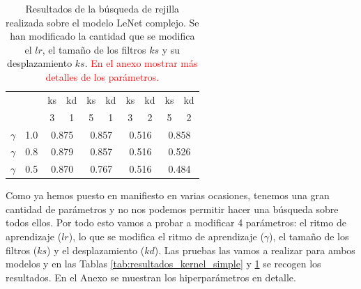 \documentclass[a4paper,12pt,twoside,titlepage]{article}
\newcommand{\red}[1]{\textcolor{red}{#1}}
\begin{document}
\begin{table}[h!]
  \centering
  \begin{tabular}{|cc||cc|cc|cc|cc|}
  \hline
  \multicolumn{2}{|c||}{\multirow{2}{*}{}} & \multicolumn{1}{c|}{ks} & kd & \multicolumn{1}{c|}{ks} & kd & \multicolumn{1}{c|}{ks} & kd & \multicolumn{1}{c|}{ks} & kd \\ \cline{3-10} 
  \multicolumn{2}{|c||}{}                  & \multicolumn{1}{c|}{3}  & 1  & \multicolumn{1}{c|}{5}  & 1  & \multicolumn{1}{c|}{3}  & 2  & \multicolumn{1}{c|}{5}  & 2  \\ \hline\hline
  \multicolumn{1}{|c|}{$\gamma$}   & 1.0  & \multicolumn{2}{c|}{0.875}   & \multicolumn{2}{c|}{0.857}   & \multicolumn{2}{c|}{0.516}   & \multicolumn{2}{c|}{0.858}   \\ \hline
  \multicolumn{1}{|c|}{$\gamma$}   & 0.8  & \multicolumn{2}{c|}{0.879}   & \multicolumn{2}{c|}{0.857}   & \multicolumn{2}{c|}{0.516}   & \multicolumn{2}{c|}{0.526}   \\ \hline
  \multicolumn{1}{|c|}{$\gamma$}   & 0.5  & \multicolumn{2}{c|}{0.870}   & \multicolumn{2}{c|}{0.767}   & \multicolumn{2}{c|}{0.516}   & \multicolumn{2}{c|}{0.484}   \\ \hline
  \end{tabular}
  \caption{Resultados de la búsqueda de rejilla realizada sobre el modelo  LeNet complejo. Se han modificado la cantidad que se modifica el $lr$, el tamaño de los filtros $ks$ y su desplazamiento $ks$. \red{En el anexo mostrar más detalles de los parámetros.}}
  \label{tab:resultados_kernel_complejo}
  \end{table}

Como ya hemos puesto en manifiesto en varias ocasiones, tenemos una gran cantidad de parámetros y no nos podemos permitir hacer una búsqueda sobre todos ellos. Por todo esto vamos a probar a modificar 4 parámetros: el ritmo de aprendizaje ($lr$), lo que se modifica el ritmo de aprendizaje ($\gamma$), el tamaño de los filtros ($ks$) y el desplazamiento ($kd$). Las pruebas las vamos a realizar para ambos modelos y en las Tablas \ref{tab:resultados_kernel_simple} y \ref{tab:resultados_kernel_complejo} se recogen los resultados. En el Anexo se muestran los hiperparámetros en detalle.


\end{document}

